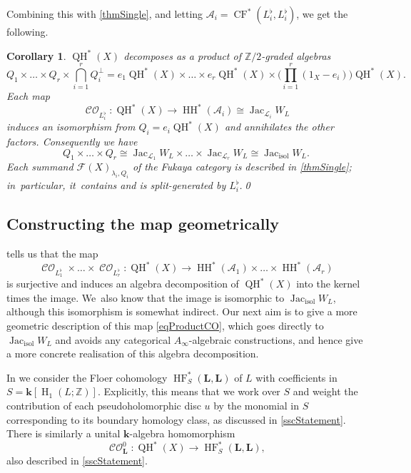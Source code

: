 \documentclass[JEP,XML,SOM,Unicode,NoEqCountersInSection,NoFloatCountersInSection,published]{cedram}
\newtheorem{corollary}[theorem]{Corollary}
\theoremstyle{definition}
\newcommand{\ZZ}{\mathbb{Z}}
\newcommand{\LL}{L^\flat}
\newcommand{\calA}{\mathcal{A}}
\newcommand{\calL}{\mathcal{L}}
\newcommand{\Fuk}{\mathcal{F}}
\newcommand{\kk}{{\boldsymbol{k}}}
\newcommand{\bL}{{\boldsymbol{L}}}
\newcommand{\isol}{\mathrm{isol}}
\newcommand{\rH}{\operatorname{H}}
\newcommand{\HH}{\operatorname{HH}}
\newcommand{\HF}{\operatorname{HF}}
\newcommand{\CF}{\operatorname{CF}}
\newcommand{\CO}{\operatorname{\mathcal{CO}}}
\newcommand{\QH}{\operatorname{QH}}
\newcommand{\Jac}{\operatorname{Jac}}
\newcommand{\Jacisol}{\operatorname{Jac}_\isol}
\begin{document}
Combining this with \cref{thmSingle}, and letting $\calA_i = \CF^*(\LL_i, \LL_i)$, we get the following.

\begin{corollary}
\label{thmSeveral}
$\QH^*(X)$ decomposes as a product of $\ZZ/2$-graded algebras
\[
Q_1 \times \dots \times Q_r \times \bigcap_{i=1}^r Q_i^\perp = e_1 \QH^*(X) \times \dots \times e_r \QH^*(X) \times \Big(\prod_{i=1}^r (1_X-e_i)\Big) \QH^*(X).
\]
Each map
\[
\CO_{\LL_i} : \QH^*(X) \to \HH^*(\calA_i) \cong \Jac_{\calL_i} W_L
\]
induces an isomorphism from $Q_i = e_i \QH^*(X)$ and annihilates the other factors. Consequently we have
\[
Q_1 \times \dots \times Q_r \cong \Jac_{\calL_1} W_L \times \dots \times \Jac_{\calL_r} W_L \cong \Jacisol W_L.
\]
Each summand $\Fuk(X)_{\lambda_i, Q_i}$ of the Fukaya category is described in \cref{thmSingle}; in~particular, it~contains and is split-generated by $\LL_i$.\qed
\end{corollary}

\subsection{Constructing the map geometrically}
\label{sscCOL}

 tells us that the map
\begin{equation}
\label{eqProductCO}
\CO_{\LL_1} \times \dots \times \CO_{\LL_r} : \QH^*(X) \to \HH^*(\calA_1) \times \dots \times \HH^*(\calA_r)
\end{equation}
is surjective and induces an algebra decomposition of $\QH^*(X)$ into the kernel times the image. We~also know that the image is isomorphic to $\Jacisol W_L$, although this isomorphism is somewhat indirect. Our next aim is to give a more geometric description of this map \eqref{eqProductCO}, which goes directly to $\Jacisol W_L$ and avoids any categorical $A_\infty$\nobreakdash-algebraic constructions, and hence give a more concrete realisation of this algebra decomposition.

In \cite{SmithHHviaHF} we consider the Floer cohomology $\HF^*_S(\bL, \bL)$ of $L$ with coefficients in $S = \kk[\rH_1(L; \ZZ)]$. Explicitly, this means that we work over $S$ and weight the contribution of each pseudoholomorphic disc $u$ by the monomial in $S$ corresponding to its boundary homology class, as discussed in \cref{sscStatement}. There is similarly a unital $\kk$-algebra homomorphism
\[
\CO^0_{\bL} : \QH^*(X) \to \HF^*_S(\bL, \bL),
\]
also described in \cref{sscStatement}.
\end{document}

